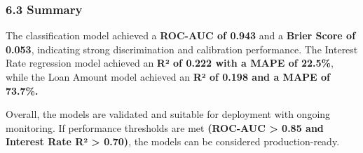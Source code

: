 \documentclass[11pt]{article}
\begin{document}
    
    \subsubsection{6.3 Summary}\label{summary}

    The classification model achieved a \textbf{ROC-AUC of 0.943} and a
\textbf{Brier Score of 0.053}, indicating strong discrimination and
calibration performance. The Interest Rate regression model achieved an
\textbf{R² of 0.222 with a MAPE of 22.5\%}, while the Loan Amount model
achieved an \textbf{R² of 0.198 and a MAPE of 73.7\%.}

Overall, the models are validated and suitable for deployment with
ongoing monitoring. If performance thresholds are met \textbf{(ROC-AUC
\textgreater{} 0.85 and Interest Rate R² \textgreater{} 0.70)}, the
models can be considered production-ready.


    
    
    
\end{document}
